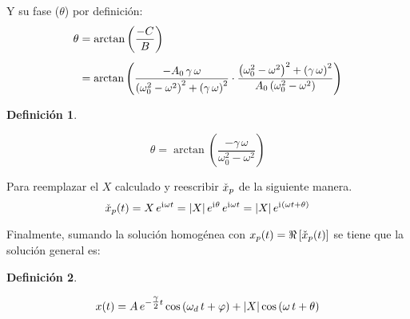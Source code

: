 \documentclass[a5paper,12pt,twoside]{book}
\newtheorem{defn}{{Definición}}[chapter]
\begin{document}
Y su fase ($\theta$) por definición:
\begin{align*}
    \theta &= \arctan \left( \frac{-C}{B} \right)
    \\[1ex]
    &=
    \scale{0.97}{
    \arctan \left( \frac{-A_0 \, \gamma \, \omega}{\left( \omega_0^2 - \omega^2 \right)^2 + \left( \gamma \, \omega \right)^2} \cdot \frac{\left( \omega_0^2 - \omega^2 \right)^2 + \left( \gamma \, \omega \right)^2}{A_0 \left( \omega_0^2 - \omega^2 \right)} \right)
    }
\end{align*}

\begin{mdframed}[style=MyFrame1]
    \begin{defn}
    \end{defn}
    \begin{equation*}
        \theta = \arctan \left( \frac{-\gamma \, \omega}{\omega_0^2 - \omega^2} \right)
    \end{equation*}
\end{mdframed}

Para reemplazar el $X$ calculado y reescribir $\check{x}_p$ de la siguiente manera.
\[
    \check{x}_p(t) = X \, e^{\mathrm{i}\mkern1mu \omega t} = {\left| {X} \right|} \, e^{\mathrm{i}\mkern1mu \theta} \, e^{\mathrm{i}\mkern1mu \omega t} = {\left| {X} \right|} \, e^{\mathrm{i}\mkern1mu \left(\omega t + \theta \right)}
\]

Finalmente, sumando la solución homogénea con $x_p(t) = \Re \left[ \check{x}_p(t) \right]$ se tiene que la solución general es:

\begin{mdframed}[style=MyFrame1]
    \begin{defn}
    \end{defn}
    \begin{equation*}
        x(t) = A \, e^{-\tfrac{\gamma}{2} t} \cos \left( \omega_d \, t + \varphi \right) + {\left| {X} \right|} \cos \left( \omega \, t + \theta \right)
    \end{equation*}
\end{mdframed}
\end{document}

